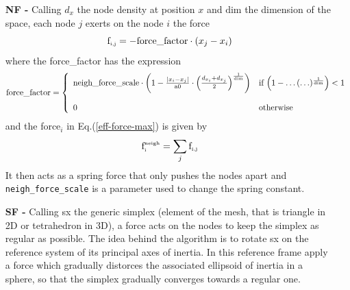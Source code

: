 \documentclass[10pt,a4paper]{book}
\newcommand{\py}[1]{\texttt{\color{blue}#1}}
\begin{document}
\begin{itemize}
\item[\bf{NF -}] Calling $d_x$ the node density
  at position $x$ and $\textrm{dim}$ the dimension of the space, 
  each node $j$ exerts on the node $i$ the force
  \begin{equation}
    \textrm{f}_{\textrm{\tiny {i,j}}} = -\textrm{force\_factor} \cdot \left( x_j - x_i\right)
  \end{equation}
  where the force\_factor has the expression
  \begin{displaymath}
    \textrm{force\_factor} = \left\{ \begin{array}{ll}
        \textrm{neigh\_force\_scale} \cdot \left( 1 - \frac{\mid x_i -
            x_j \mid}
          {\textrm{a0}} \cdot \left( \frac{d_{x_i} +
              d_{x_j}}{2} \right)^{\frac{1}{\textrm{\tiny dim}}} \right)
        & \textrm{if
          $\left( 1 - \ldots (\ldots)^{\frac{1}{\textrm{\tiny dim}}} \right) <
          1$}\\
        & \\
        0 & \textrm{otherwise}
      \end{array} \right.
  \end{displaymath}
and the force$_i$ in Eq.(\ref{eff-force-max}) is given by 
\begin{equation}
  \textrm{f}^{\textrm{\tiny neigh}}_{\textrm{\tiny i}} = \sum_j
  \textrm{f}_{\textrm{\tiny i,j}}  
\end{equation}
It then acts as a spring force that only pushes the nodes apart and
\py{neigh\_force\_scale} is a parameter used to change the spring constant. 
\item[\textbf {SF -}] Calling sx the generic simplex (element of the
  mesh, that is triangle in 2D or tetrahedron in 3D), a force acts
  on the nodes to keep the simplex as regular as possible. The idea
  behind the algorithm is to rotate sx on the reference system
  of its principal axes of inertia. In this reference frame apply a
  force which gradually distorces the associated ellipsoid of inertia 
  in a sphere, so that the simplex gradually converges towards a regular one.

\end{itemize}
\end{document}
